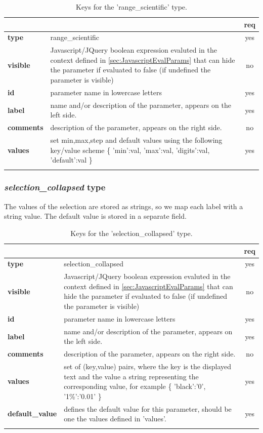 \begin{longtable}{|>{\bf}L{\linewidth}|L{\linewidth}|c|}
\hline
      &  & {\bf req} 
\tabularnewline \hline \hline
 type  & range\_scientific       & yes \\ \hline
 visible  & Javascript/JQuery boolean expression evaluted in the context defined 
              in \ref{sec:JavascriptEvalParams} that can hide the parameter if
            evaluated to false (if undefined the parameter is visible)& no \\ \hline
 id     & parameter name in lowercase letters  & yes \\ \hline
 label  & name and/or description of the parameter, appears on the left side. & yes
                      \\ \hline
 comments & description of the parameter, appears on the right side. & no
                      \\ \hline
 values & set min,max,step and default values using the following key/value 
scheme \{ 'min':val, 'max':val, 'digits':val, 'default':val \} & yes
                      \\ \hline
\caption{Keys for the 'range\_scientific' type.}
\end{longtable}


\subsubsection{ \emph{selection\_collapsed} type}

The values of the selection are stored as strings, so we map each label with a 
string value. The default value is stored in a separate field.

\begin{longtable}{|>{\bf}L{\linewidth}|L{\linewidth}|c|}
\hline
      &  & {\bf req} 
\tabularnewline \hline \hline
 type  & selection\_collapsed    & yes \\ \hline
 visible  & Javascript/JQuery boolean expression evaluted in the context defined 
              in \ref{sec:JavascriptEvalParams} that can hide the parameter if
            evaluated to false (if undefined the parameter is visible)& no \\ \hline
 id     & parameter name in lowercase letters & yes \\ \hline
 label  & name and/or description of the parameter, appears on the left side. & yes
                      \\ \hline
 comments & description of the parameter, appears on the right side. & no
                      \\ \hline
 values & set of (key,value) pairs, where the key is the displayed text and the 
value a string representing the corresponding value, for example \{ 
'black':'0', '1\%':'0.01' \} & yes
                      \\ \hline
 default\_value & defines the default value for this parameter, should be one 
the values defined in 'values'. & yes \\ \hline
\caption{Keys for the 'selection\_collapsed' type.}
\end{longtable}

